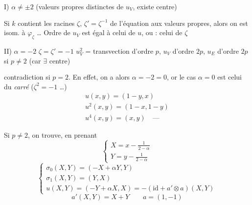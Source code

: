 \documentclass[11pt,a4paper]{article}
\begin{document}

I) $\alpha \neq \pm 2$ (valeurs propres distinctes de $u_V$, existe centre)

 Si $k$ contient les racines $\zeta$, $\zeta' = \zeta^{-1}$ de l'équation aux valeurs propres, alors on est isom. à \struck{$\Pi_\zeta$} $\varphi_\zeta$ … Ordre de $u_V$ est égal à celui de $u$, ou  : celui de $\zeta$





II) $\alpha = -2$ \qquad $\zeta = \zeta' = -1$ \qquad {} $u_V^2$ = transvection d'ordre $p$, $u_V$ d'ordre $2p$, $u_E$ d'ordre $2p$ si $p \neq 2$ (car $\exists$ centre)

 contradiction si $p = 2$. En effet, on a alors $\alpha = -2 = 0$, or le cas $\alpha = 0$ est celui du \emph{carré} ($\zeta^2 = -1$ …)
\[
\begin{array}{l}
u(x,y) = (1 - y, x) \\
u^2(x,y) = (1 - x, 1 - y) \\
u^4(x,y) = (x, y) \quad \text{---}
\end{array}
\]

Si $p \neq 2$,  on trouve, en prenant
\[
\begin{cases}
X = x - \frac{1}{2-\alpha} \\
Y = y - \frac{1}{2-\alpha}
\end{cases}
\]
\[
\begin{cases}
\sigma_0(X,Y) = (-X + \alpha Y, Y) \\
\sigma_1(X,Y) = (Y, X) \\
u(X,Y) = (-Y + \alpha X, X) = -(\mathrm{id} + a' \otimes a)(X,Y)
\end{cases}
\]
\[
a'(X,Y) = X + Y \qquad a = (1, -1)
\]
\end{document}
